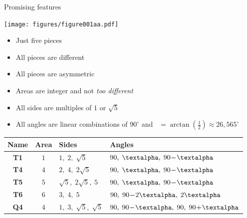 \documentclass[14pt]{beamer}
\begin{document}
    \begin{frame}{Promising features}
        \begin{center}

            \begin{minipage}{17.5ex}\vspace{2ex}
                \texttt{[image: figures/figure001aa.pdf]}\\
            \end{minipage}\begin{minipage}{30ex}
                \footnotesize
                \begin{itemize}
                    \item Just five pieces
                    \item All pieces are different
                    \item All pieces are asymmetric
                    \item Areas are integer and not \emph{too different}
                    \item All sides are multiples of $1$ or $\sqrt{5}$
                    \item All angles are linear combinations of $90^\circ$ and \textalpha\ $= \arctan{\!\left(\tfrac{1}{2}\right)} \approx 26,565^\circ$
                \end{itemize}
            \end{minipage}

            \smallskip

            {\footnotesize
            \begin{tabular}{c|c|l|l}
                \;\;\textbf{Name}\;\; & \;\;\textbf{Area}\;\; & \;\;\textbf{Sides}          & \;\;\textbf{Angles} \\ \hline
                \textbf{T1}   & $1$           & \;\;$1,\; 2,\; \sqrt{5}$          & \;\;$90,\; \text{\textalpha},\; 90\!-\!\text{\textalpha}$   \\ \hline
                \textbf{T4}   & $4$           & \;\;$2,\; 4,\; 2\sqrt{5}$         & \;\;$90,\; \text{\textalpha},\; 90\!-\!\text{\textalpha}$   \\ \hline
                \textbf{T5}   & $5$           & \;\;$\sqrt{5},\; 2\sqrt{5},\; 5$  & \;\;$90,\; \text{\textalpha},\; 90\!-\!\text{\textalpha}$   \\ \hline
                \textbf{T6}   & $6$           & \;\;$3,\; 4,\; 5$                 & \;\;$90,\; 90\!-\!2\text{\textalpha},\; 2\text{\textalpha}$ \\ \hline
                \textbf{Q4}   & $4$           & \;\;$1,\; 3,\; \sqrt{5},\; \sqrt{5}$\;\; & \;\;$90,\; 90\!-\!\text{\textalpha},\; 90,\; 90\!+\!\text{\textalpha}$\;\;
            \end{tabular}}
        \end{center}
    \end{frame}
\end{document}

